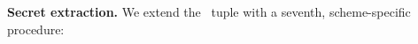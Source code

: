 \textbf{Secret extraction.}
We extend the \GZKST\ tuple with a seventh, scheme-specific procedure:

